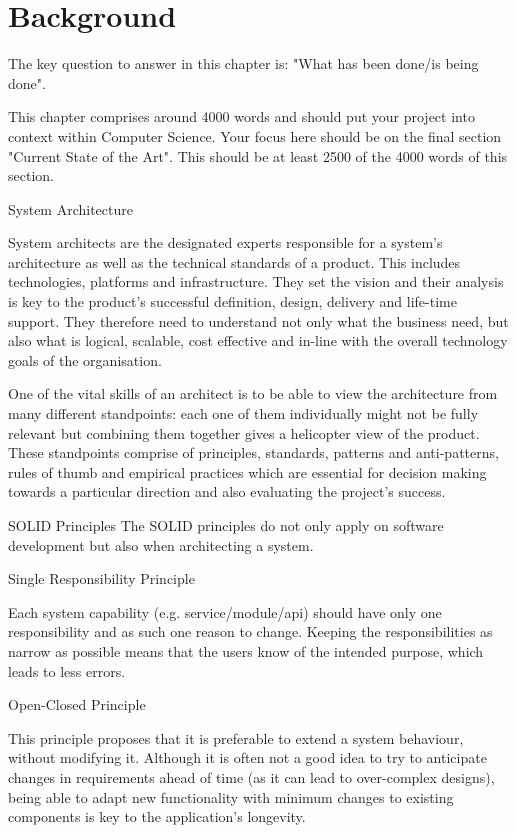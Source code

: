 \chapter{Background}
\label{chap:background}
The key question to answer in this chapter is: "What has been done/is being done". 

This chapter comprises around 4000 words and should put your project into context within Computer Science. Your focus here should be on the final section "Current State of the Art". This should be at least 2500 of the 4000 words of this section.

System Architecture

System architects are the designated experts responsible for a system’s architecture as well as the technical standards of a product. This includes technologies, platforms and infrastructure. They set the vision and their analysis is key to the product’s successful definition, design, delivery and life-time support. They therefore need to understand not only what the business need, but also what is logical, scalable, cost effective and in-line with the overall technology goals of the organisation. \cite{Clements2013}

One of the vital skills of an architect is to be able to view the architecture from many different standpoints: each one of them individually might not be fully relevant but combining them together gives a helicopter view of the product. These standpoints comprise of principles, standards, patterns and anti-patterns, rules of thumb and empirical practices which are essential for decision making towards a particular direction and also evaluating the project’s success. \cite{Koen2019}


SOLID Principles
The SOLID principles do not only apply on software development but also when architecting a system.

Single Responsibility Principle

Each system capability (e.g. service/module/api) should have only one responsibility and as such one reason to change. Keeping the responsibilities as narrow as possible means that the users know of the intended purpose, which leads to less errors.

Open-Closed Principle

This principle proposes that it is preferable to extend a system behaviour, without modifying it. Although it is often not a good idea to try to anticipate changes in requirements ahead of time (as it can lead to over-complex designs), being able to adapt new functionality with minimum changes to existing components is key to the application’s longevity. \cite{Baniassad2018}

